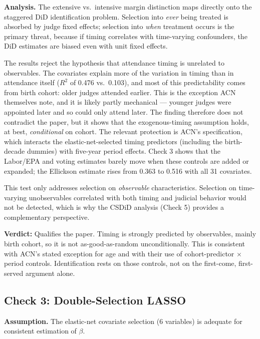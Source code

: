 \documentclass[12pt,a4paper]{article}
\begin{document}
\textbf{Analysis.} The extensive vs.\ intensive margin distinction maps directly onto the staggered DiD identification problem. Selection into \emph{ever} being treated is absorbed by judge fixed effects; selection into \emph{when} treatment occurs is the primary threat, because if timing correlates with time-varying confounders, the DiD estimates are biased even with unit fixed effects.

The results reject the hypothesis that attendance timing is unrelated to observables. The covariates explain more of the variation in timing than in attendance itself ($R^2$ of 0.476 vs.\ 0.103), and most of this predictability comes from birth cohort: older judges attended earlier. This is the exception ACN themselves note, and it is likely partly mechanical --- younger judges were appointed later and so could only attend later. The finding therefore does not contradict the paper, but it shows that the exogenous-timing assumption holds, at best, \emph{conditional} on cohort. The relevant protection is ACN's specification, which interacts the elastic-net-selected timing predictors (including the birth-decade dummies) with five-year period effects. Check 3 shows that the Labor/EPA and voting estimates barely move when these controls are added or expanded; the Ellickson estimate rises from 0.363 to 0.516 with all 31 covariates.

This test only addresses selection on \emph{observable} characteristics. Selection on time-varying unobservables correlated with both timing and judicial behavior would not be detected, which is why the CSDiD analysis (Check 5) provides a complementary perspective.

\textbf{Verdict:} Qualifies the paper. Timing is strongly predicted by observables, mainly birth cohort, so it is not as-good-as-random unconditionally. This is consistent with ACN's stated exception for age and with their use of cohort-predictor $\times$ period controls. Identification rests on those controls, not on the first-come, first-served argument alone.

\subsection{Check 3: Double-Selection LASSO}
\label{sec:check3}

\textbf{Assumption.} The elastic-net covariate selection (6 variables) is adequate for consistent estimation of $\beta$.
\end{document}
